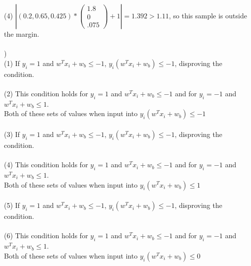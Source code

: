 \documentclass[12pt]{article}
\begin{document}
\indent (4) $|(0.2, 0.65, 0.425)*
\begin{pmatrix}
1.8\\ 0\\ .075
\end{pmatrix}
 + 1|= 1.392 > 1.11$, so this sample is outside the margin.\\



\noindent \hrulefill \\



) \\
\indent (1) If $y_i = 1$ and $w^Tx_i+w_b \le -1$, $y_i(w^Tx_i+w_b) \le -1$, disproving the condition.\\\\
\indent (2) This condition holds for $y_i = 1$ and $w^Tx_i+w_b \le -1$ and for $y_i = -1$ and $w^Tx_i+w_b \le 1$. \\
\indent \indent Both of these sets of values when input into $y_i(w^Tx_i+w_b) \le -1$\\\\
\indent (3) If $y_i = 1$ and $w^Tx_i+w_b \le -1$, $y_i(w^Tx_i+w_b) \le -1$, disproving the condition.\\\\
\indent (4) This condition holds for $y_i = 1$ and $w^Tx_i+w_b \le -1$ and for $y_i = -1$ and $w^Tx_i+w_b \le 1$. \\
\indent \indent Both of these sets of values when input into $y_i(w^Tx_i+w_b) \le 1$\\\\
\indent (5) If $y_i = 1$ and $w^Tx_i+w_b \le -1$, $y_i(w^Tx_i+w_b) \le -1$, disproving the condition.\\\\
\indent (6) This condition holds for $y_i = 1$ and $w^Tx_i+w_b \le -1$ and for $y_i = -1$ and $w^Tx_i+w_b \le 1$. \\
\indent \indent Both of these sets of values when input into $y_i(w^Tx_i+w_b) \le 0$\\\\


\end{document}
